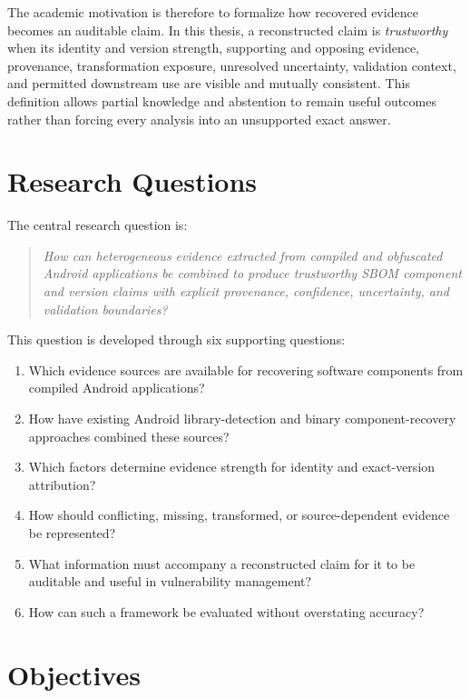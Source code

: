 The academic motivation is therefore to formalize how recovered evidence
becomes an auditable claim. In this thesis, a reconstructed claim is
\emph{trustworthy} when its identity and version strength, supporting and
opposing evidence, provenance, transformation exposure, unresolved
uncertainty, validation context, and permitted downstream use are visible and
mutually consistent. This definition allows partial knowledge and abstention
to remain useful outcomes rather than forcing every analysis into an
unsupported exact answer.

\section{Research Questions}

The central research question is:

\begin{quote}
\emph{How can heterogeneous evidence extracted from compiled and obfuscated
Android applications be combined to produce trustworthy SBOM component and
version claims with explicit provenance, confidence, uncertainty, and
validation boundaries?}
\end{quote}

This question is developed through six supporting questions:

\begin{enumerate}
  \item Which evidence sources are available for recovering software
    components from compiled Android applications?
  \item How have existing Android library-detection and binary
    component-recovery approaches combined these sources?
  \item Which factors determine evidence strength for identity and
    exact-version attribution?
  \item How should conflicting, missing, transformed, or source-dependent
    evidence be represented?
  \item What information must accompany a reconstructed \SBOM claim for it to
    be auditable and useful in vulnerability management?
  \item How can such a framework be evaluated without overstating accuracy?
\end{enumerate}

\section{Objectives}

